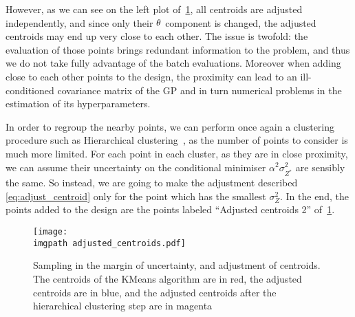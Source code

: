 \documentclass[../../Main_ManuscritThese.tex]{subfiles}
\newcommand\imgpath{/home/victor/acadwriting/Manuscrit/Text/Chapter4/img/}
\begin{document}
However, as we can see on the left plot of~\cref{fig:adjusted_centroids}, all centroids are adjusted independently, and since only their $\theta$ component is changed, the adjusted centroids may end up very close to each other. The issue is twofold: the evaluation of those points brings redundant information to the problem, and thus we do not take fully advantage of the batch evaluations. Moreover when adding close to each other points to the design, the proximity can lead to an ill-conditioned covariance matrix of the GP and in turn numerical problems in the estimation of its hyperparameters.


In order to regroup the nearby points, we can perform once again a clustering procedure such as Hierarchical clustering~\cite{nielsen_hierarchical_2016}, as the number of points to consider is much more limited.
For each point in each cluster, as they are in close proximity, we can assume their uncertainty on the conditional minimiser $\alpha^2\sigma^2_{Z^*}$ are sensibly the same. So instead, we are going to make the adjustment described \cref{eq:adjust_centroid} only for the point which has the smallest $\sigma^2_Z$. In the end, the points added to the design are the points labeled ``Adjusted centroids 2'' of~\cref{fig:adjusted_centroids}.


\begin{figure}[ht]
  \centering
  \texttt{[image: \\imgpath adjusted\_centroids.pdf]}
  \caption{\label{fig:adjusted_centroids} Sampling in the margin of uncertainty, and adjustment of centroids. The centroids of the KMeans algorithm are in red, the adjusted centroids are in blue, and the adjusted centroids after the hierarchical clustering step are in magenta}
\end{figure}
\end{document}
